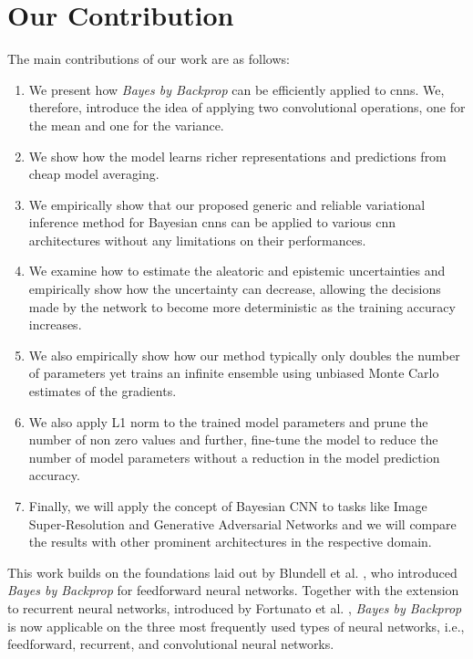 \section{Our Contribution}
\newline The main contributions of our work are as follows: 
\begin{enumerate}
    \item We present how \textit{Bayes by Backprop} can be efficiently applied to \acp{cnn}. We, therefore, introduce the idea of applying two convolutional operations, one for the mean and one for the variance.
    \item We show how the model learns richer representations and predictions from cheap model averaging.
    \item We empirically show that our proposed generic and reliable variational inference method for Bayesian \acp{cnn} can be applied to various \ac{cnn} architectures without any limitations on their performances. 
    \item We examine how to estimate the aleatoric and epistemic uncertainties and empirically show how the uncertainty can decrease, allowing the decisions made by the network to become more deterministic as the training accuracy increases. 
    \item We also empirically show how our method typically only doubles the number of parameters yet trains an infinite ensemble using unbiased Monte Carlo estimates of the gradients. 
    \item We also apply L1 norm to the trained model parameters and prune the number of non zero values and further, fine-tune the model to reduce the number of model parameters without a reduction in the model prediction accuracy. 
    \item Finally, we will apply the concept of Bayesian CNN to tasks like Image Super-Resolution and Generative Adversarial Networks and we will compare the results with other prominent architectures in the respective domain.
\end{enumerate} 
This work builds on the foundations laid out by Blundell et al. \cite{blundell2015weight}, who introduced \textit{Bayes by Backprop} for feedforward neural networks. Together with the extension to recurrent neural networks, introduced by Fortunato et al. \cite{fortunato2017bayesian}, \textit{Bayes by Backprop} is now applicable on the three most frequently used types of neural networks, i.e., feedforward, recurrent, and convolutional neural networks.


